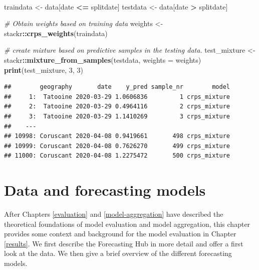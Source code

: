 \documentclass[
]{book}
\newenvironment{Shaded}{\begin{snugshade}}{\end{snugshade}}
\newcommand{\CommentTok}[1]{\textcolor[rgb]{0.56,0.35,0.01}{\textit{#1}}}
\newcommand{\DataTypeTok}[1]{\textcolor[rgb]{0.13,0.29,0.53}{#1}}
\newcommand{\DecValTok}[1]{\textcolor[rgb]{0.00,0.00,0.81}{#1}}
\newcommand{\KeywordTok}[1]{\textcolor[rgb]{0.13,0.29,0.53}{\textbf{#1}}}
\newcommand{\NormalTok}[1]{#1}
\newcommand{\OperatorTok}[1]{\textcolor[rgb]{0.81,0.36,0.00}{\textbf{#1}}}
\newcommand{\StringTok}[1]{\textcolor[rgb]{0.31,0.60,0.02}{#1}}
\begin{document}
\(~\)

\begin{Shaded}
\begin{Highlighting}[]
\NormalTok{traindata \textless{}{-}}\StringTok{ }\NormalTok{data[date }\OperatorTok{\textless{}=}\StringTok{ }\NormalTok{splitdate]}
\NormalTok{testdata \textless{}{-}}\StringTok{ }\NormalTok{data[date }\OperatorTok{\textgreater{}}\StringTok{ }\NormalTok{splitdate]}

\CommentTok{\# Obtain weights based on training data}
\NormalTok{weights \textless{}{-}}\StringTok{ }\NormalTok{stackr}\OperatorTok{::}\KeywordTok{crps\_weights}\NormalTok{(traindata)}

\CommentTok{\# create mixture based on predictive samples in the testing data. }
\NormalTok{test\_mixture \textless{}{-}}\StringTok{ }\NormalTok{stackr}\OperatorTok{::}\KeywordTok{mixture\_from\_samples}\NormalTok{(testdata, }\DataTypeTok{weights =}\NormalTok{ weights)}
\KeywordTok{print}\NormalTok{(test\_mixture, }\DecValTok{3}\NormalTok{, }\DecValTok{3}\NormalTok{)}
\end{Highlighting}
\end{Shaded}

\begin{verbatim}
##        geography       date    y_pred sample_nr        model
##     1:  Tatooine 2020-03-29 1.0606836         1 crps_mixture
##     2:  Tatooine 2020-03-29 0.4964116         2 crps_mixture
##     3:  Tatooine 2020-03-29 1.1410269         3 crps_mixture
##    ---                                                      
## 10998: Coruscant 2020-04-08 0.9419661       498 crps_mixture
## 10999: Coruscant 2020-04-08 0.7626270       499 crps_mixture
## 11000: Coruscant 2020-04-08 1.2275472       500 crps_mixture
\end{verbatim}

\hypertarget{background-data}{%
\chapter{Data and forecasting models}\label{background-data}}

After Chapters \ref{evaluation} and \ref{model-aggregation} have described the theoretical foundations of model evaluation and model aggregation, this chapter provides some context and background for the model evaluation in Chapter \ref{results}. We first describe the Forecasting Hub in more detail and offer a first look at the data. We then give a brief overview of the different forecasting models.
\end{document}
